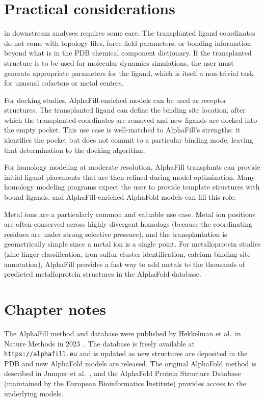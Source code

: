 \section{Practical considerations}
\label{sec:alphafill-practical}

 in downstream analyses requires some care. The transplanted ligand coordinates do not come with topology files, force field parameters, or bonding information beyond what is in the PDB chemical component dictionary. If the transplanted structure is to be used for molecular dynamics simulations, the user must generate appropriate parameters for the ligand, which is itself a non-trivial task for unusual cofactors or metal centers.

For docking studies, AlphaFill-enriched models can be used as receptor structures. The transplanted ligand can define the binding site location, after which the transplanted coordinates are removed and new ligands are docked into the empty pocket. This use case is well-matched to AlphaFill's strengths: it identifies the pocket but does not commit to a particular binding mode, leaving that determination to the docking algorithm.

For homology modeling at moderate resolution, AlphaFill transplants can provide initial ligand placements that are then refined during model optimization. Many homology modeling programs expect the user to provide template structures with bound ligands, and AlphaFill-enriched AlphaFold models can fill this role.

Metal ions are a particularly common and valuable use case. Metal ion positions are often conserved across highly divergent homologs (because the coordinating residues are under strong selective pressure), and the transplantation is geometrically simple since a metal ion is a single point. For metalloprotein studies (zinc finger classification, iron-sulfur cluster identification, calcium-binding site annotation), AlphaFill provides a fast way to add metals to the thousands of predicted metalloprotein structures in the AlphaFold database.


\section{Chapter notes}
\label{sec:ch08-notes}

The AlphaFill method and database were published by Hekkelman et al.\ in Nature Methods in 2023~\cite{hekkelman2023}. The database is freely available at \texttt{https://alphafill.eu} and is updated as new structures are deposited in the PDB and new AlphaFold models are released. The original AlphaFold method is described in Jumper et al.~\cite{jumper2021}, and the AlphaFold Protein Structure Database (maintained by the European Bioinformatics Institute) provides access to the underlying models.

